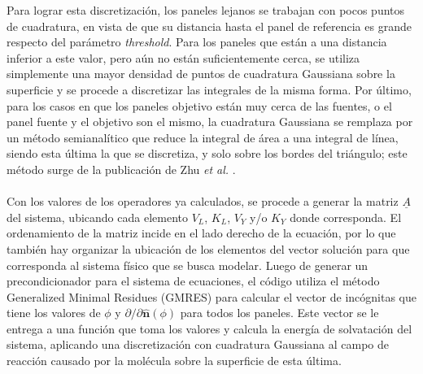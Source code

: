 \documentclass[12pt, oneside, numbers, spanish]{ezthesis}
\numberwithin{equation}{section}
\begin{document}
Para lograr esta discretización, los paneles lejanos se trabajan con pocos puntos de cuadratura, en vista de que su distancia hasta el panel de referencia es grande respecto del parámetro \textit{threshold}. Para los paneles que están a una distancia inferior a este valor, pero aún no están suficientemente cerca, se utiliza simplemente una mayor densidad de puntos de cuadratura Gaussiana sobre la superficie y se procede a discretizar las integrales de la misma forma. Por último, para los casos en que los paneles objetivo están muy cerca de las fuentes, o el panel fuente y el objetivo son el mismo, la cuadratura Gaussiana se remplaza por un método semianalítico que reduce la integral de área a una integral de línea, siendo esta última la que se discretiza, y solo sobre los bordes del triángulo; este método surge de la publicación de Zhu \textit{et al.} \cite{Zhu}.\\\\
Con los valores de los operadores ya calculados, se procede a generar la matriz $\underline{A}$ del sistema, ubicando cada elemento $V_L$, $K_L$, $V_Y$ y/o $K_Y$ donde corresponda. El ordenamiento de la matriz incide en el lado derecho de la ecuación, por lo que también hay organizar la ubicación de los elementos del vector solución para que corresponda al sistema físico que se busca modelar. Luego de generar un precondicionador para el sistema de ecuaciones, el código utiliza el método Generalized Minimal Residues (GMRES) para calcular el vector de incógnitas que tiene los valores de $\phi$ y $\partial/\partial\hat{\mathbf{n}}(\phi)$ para todos los paneles. Este vector se le entrega a una función que toma los valores y calcula la energía de solvatación del sistema, aplicando una discretización con cuadratura Gaussiana al campo de reacción causado por la molécula sobre la superficie de esta última. 



\end{document}
